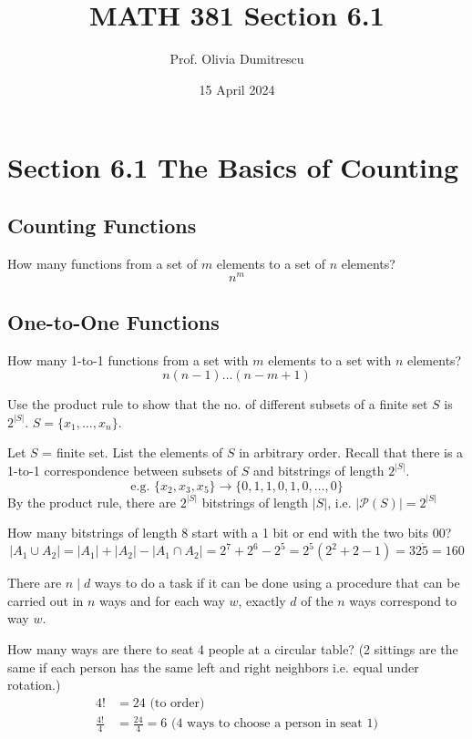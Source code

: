\documentclass[letterpaper, 12pt]{article}
\title{MATH 381 Section 6.1}
\author{Prof. Olivia Dumitrescu}
\date{15 April 2024}
\newenvironment{example}[1][Example]{\begin{trivlist}
\item[\hskip \labelsep {\bfseries #1}]}{\end{trivlist}}
\newcommand{\0}{\emptyset}
\newcommand{\power}{\mathcal{P}}
\begin{document}
    \maketitle
    \section*{Section 6.1 The Basics of Counting}
    \subsection*{Counting Functions}
    How many functions from a set of $m$ elements to a set of $n$ elements?
    \[n^m\]
    \subsection*{One-to-One Functions}
    How many 1-to-1 functions from a set with $m$ elements to a set with $n$ elements?
    \[n(n-1)\dots(n-m+1)\]
    \begin{example}
        Use the product rule to show that the no. of different subsets of a finite set $S$ is 
        $2^{|S|}$. $S = \{x_1,\dots,x_n\}$.
        \begin{flushleft}
            Let $S$ = finite set. List the elements of $S$ in arbitrary order. Recall that there 
            is a 1-to-1 correspondence between subsets of $S$ and bitstrings of length $2^{|S|}$.
            \[\text{e.g. } \{x_2, x_3, x_5\} \to \{0, 1, 1, 0, 1, 0,\dots, 0\}\]
            By the product rule, there are $2^{|S|}$ bitstrings of length $|S|$, i.e. 
            $|\power(S)| = 2^{|S|}$
        \end{flushleft}
    \end{example}
    \begin{example}
        How many bitstrings of length 8 start with a 1 bit or end with the two bits 00?
        \[|A_1 \cup A_2| = |A_1| + |A_2| - |A_1 \cap A_2| = 2^7 + 2^6 - 2^5 
        = 2^5 (2^2 + 2 - 1) = 32 \dot 5 = 160\]
    \end{example}
    There are $n \mid d$ ways to do a task if it can be done using a procedure that can be carried 
    out in $n$ ways and for each way $w$, exactly $d$ of the $n$ ways correspond to way $w$.
    \begin{example}
        How many ways are there to seat 4 people at a circular table? (2 sittings are the same if 
        each person has the same left and right neighbors i.e. equal under rotation.)
        \begin{align*}
            4! &= 24 \text{ (to order)} \\
            \frac{4!}{4} &= \frac{24}{4} = 6 \text{ (4 ways to choose a person in seat 1)}
        \end{align*}
    \end{example}
\end{document}
